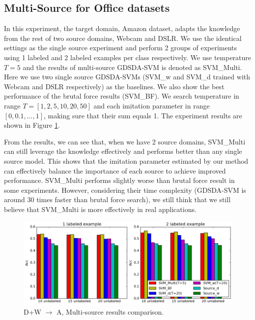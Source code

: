 \subsection{Multi-Source for Office datasets}
In this experiment, the target domain, Amazon dataset, adapts the knowledge from the rest of two source domains, Webcam and DSLR.
We use the identical settings as the single source experiment and perform 2 groups of experiments using 1 labeled and 2 labeled examples per class respectively. We use temperature $T=5$ and the results of multi-source GDSDA-SVM is denoted as SVM\_Multi. Here we use two single source GDSDA-SVMs (SVM\_w and SVM\_d trained with Webcam and DSLR respectively) as the baselines. We also show the best performance of the brutal force results (SVM\_BF). We search temperature in range $T=[1,2,5,10,20,50]$ and each imitation parameter in range $[0,0.1,...,1]$, making sure that their sum equals 1. The experiment results are shown in Figure \ref{fig:multi}.

From the results, we can see that, when we have 2 source domains, SVM\_Multi can still leverage the knowledge effectively and performs better than any single source model. This shows that the imitation parameter estimated by our method can effectively balance the importance of each source to achieve improved performance. SVM\_Multi performs slightly worse than brutal force result in some experiments. However, considering their time complexity (GDSDA-SVM is around 30 times faster than brutal force search), we still think that we still believe that SVM\_Multi is more effectively in real applications.
\begin{figure}
\centering
\includegraphics[scale=.3]{figure/cmp.png}
\caption{D+W $\rightarrow$ A, Multi-source results comparison.}\label{fig:multi}
\end{figure}



